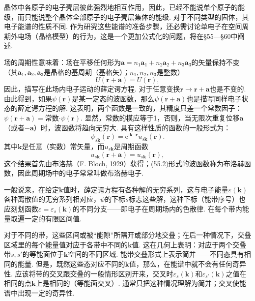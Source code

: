 晶体中各原子的电子壳层彼此强烈地相互作用，因此，已经不能说单个原子的能级，而只能说整个晶体全部原子的电子壳层集体的能级. 对于不同类型的固体，其电子能谱的性质不同. 作为研究这些能谱的准备步骤，还必需讨论单电子在空间周期外电场（晶格模型）的行为，这是一个更加公式化的问题，将在§55—§60中阐述.

场的周期性意味着：场在平移任何形为$\bm a=n_1\bm a_1+n_2\bm a_2+n_3\bm a_3$的矢量保持不变（其$\bm a_1,\bm a_2,\bm a_3$是晶格的基周期（基格矢）；$n_1,n_2,n_3$是整数）
\begin{equation}
U(\bm r+\bm a)=U(\bm r),
\label{55.1}
\end{equation}
因此，描写在此场内电子运动的薛定谔方程. 对于任意变换$\bm r\to\bm r+\bm a$也是不变的. 由此得到，如果$\psi(\bm r)$是某一定态的波函数，那么$\psi(\bm r+\bm a)$也是描写同样电子状态的薛定谔方程的解. 这表明，两个函数是一致的，其精度只差一个常数因子：$\psi(\bm r+\bm a)=$常数$\cdot\psi(\bm r)$. 显然，常数的模应等于1，否则，当无限次重复位移$\bm a$（或者$-\bm a$）时，波函数将趋向无穷大. 具有这样性质的函数的一般形式为：
\begin{equation}
\psi_{s\bm k}(\bm r)=\mathrm e^{\mathrm i\bm k\cdot\bm r}u_{s\bm k}(\bm r).
\label{55.2}
\end{equation}
其中$\bm k$是任意（实数）常矢量，而$u_{s\bm k}$是周期函数
\begin{equation}
u_{s\bm k}(\bm r+\bm a)=u_{s\bm k}(\bm r),
\label{55.3}
\end{equation}
这个结果首先由布洛赫（F. Bloch, 1929）获得；(55.2)形式的波函数称为布洛赫函数，因此周期场中的电子常常叫做布洛赫电子.

一般说来，在给定$\bm k$值时，薛定谔方程有各种解的无穷系列，这与电子能量$\varepsilon(\bm k)$各种离散值的无穷系列相对应，$\psi$的下标$s$标志这些解，这种下标（能带序号）也应刻划函数$\varepsilon=\varepsilon_s(\bm k)$的不同分支——即电子在周期场内的色散律. 在每个带内能量取遍一定的有限区间值.

对于不同的带，这些区间或被“能隙”所隔开或部分地交叠；在后一种情况下，交叠区域里的每个能量值对应于各带中不同的$\bm k$值. 这在几何上表明：对应于两个交叠带$s,s'$的等能面位于$\bm k$空间的不同区域. 能带交叠形式上表示简并——不同态具有相同的能量. 但是，既然这些态对应不同的$\bm k$值，那么，在能谱中就不会有任何奇异性. 应该将带的交叉跟交叠的一般情形区别开来，交叉时$\varepsilon_s(\bm k)$和$\varepsilon_{s'}(\bm k)$之值在相同的点$\bm k$上是相同的（等能面交叉）. 通常只把这种情况理解为简并；交叉使能谱中出现一定的奇异性.

